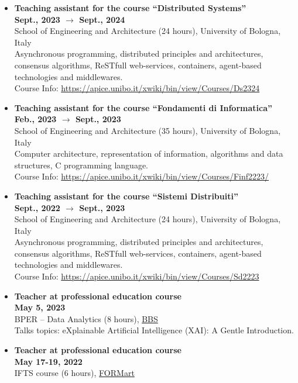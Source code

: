 \documentclass[11pt]{article}
\begin{document}
\begin{itemize}
	\item \textbf{ Teaching assistant for the course ``Distributed Systems'' }
	\\\hfill \textbf{Sept., 2023 $\rightarrow$ Sept., 2024}
	\\School of Engineering and Architecture (24 hours), University of Bologna, Italy
	\\Asynchronous programming, distributed principles and architectures, consensus algorithms, ReSTfull web-services, containers, agent-based technologies and middlewares.
	\\Course Info: \url{https://apice.unibo.it/xwiki/bin/view/Courses/Ds2324}
	\item \textbf{ Teaching assistant for the course ``Fondamenti di Informatica'' }
	\\\hfill \textbf{Feb., 2023 $\rightarrow$ Sept., 2023}
	\\School of Engineering and Architecture (35 hours), University of Bologna, Italy
	\\Computer architecture, representation of information, algorithms and data structures, C programming language.
	\\Course Info: \url{https://apice.unibo.it/xwiki/bin/view/Courses/Finf2223/}
	\item \textbf{ Teaching assistant for the course ``Sistemi Distribuiti'' }
	\\\hfill \textbf{Sept., 2022 $\rightarrow$ Sept., 2023}
	\\School of Engineering and Architecture (24 hours), University of Bologna, Italy
	\\Asynchronous programming, distributed principles and architectures, consensus algorithms, ReSTfull web-services, containers, agent-based technologies and middlewares.
	\\Course Info: \url{https://apice.unibo.it/xwiki/bin/view/Courses/Sd2223}
	\item \textbf{ Teacher at professional education course }
	\\\hfill \textbf{May 5, 2023}
	\\BPER -- Data Analytics (8 hours), \href{https://www.bbs.unibo.eu/}{BBS}
	\\Talks topics: eXplainable Artificial Intelligence (XAI): A Gentle Introduction.
	\item \textbf{ Teacher at professional education course }
	\\\hfill \textbf{May 17-19, 2022}
	\\IFTS course (6 hours), \href{http://www.formart.it/home}{FORMart}

\end{itemize}
\end{document}
